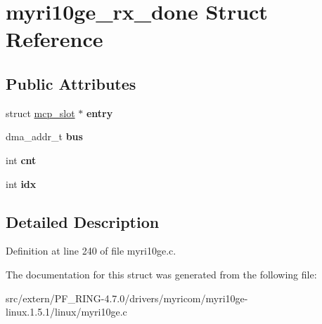 \hypertarget{structmyri10ge__rx__done}{
\section{myri10ge\_\-rx\_\-done Struct Reference}
\label{structmyri10ge__rx__done}
}
\subsection*{Public Attributes}
\begin{DoxyCompactItemize}
\item 
\hypertarget{structmyri10ge__rx__done_abfb64c5ea8531b8c7adfc3a9ff412e18}{
struct \hyperlink{structmcp__slot}{mcp\_\-slot} $\ast$ {\bfseries entry}}
\label{structmyri10ge__rx__done_abfb64c5ea8531b8c7adfc3a9ff412e18}

\item 
\hypertarget{structmyri10ge__rx__done_a774cc65333586fd1d5fc6203e5f03ff7}{
dma\_\-addr\_\-t {\bfseries bus}}
\label{structmyri10ge__rx__done_a774cc65333586fd1d5fc6203e5f03ff7}

\item 
\hypertarget{structmyri10ge__rx__done_a2587ba961744bc3cca03b26b2d571bbf}{
int {\bfseries cnt}}
\label{structmyri10ge__rx__done_a2587ba961744bc3cca03b26b2d571bbf}

\item 
\hypertarget{structmyri10ge__rx__done_a66058641ff88a7d981d84429d492b43f}{
int {\bfseries idx}}
\label{structmyri10ge__rx__done_a66058641ff88a7d981d84429d492b43f}

\end{DoxyCompactItemize}


\subsection{Detailed Description}


Definition at line 240 of file myri10ge.c.



The documentation for this struct was generated from the following file:\begin{DoxyCompactItemize}
\item 
src/extern/PF\_\-RING-\/4.7.0/drivers/myricom/myri10ge-\/linux.1.5.1/linux/myri10ge.c\end{DoxyCompactItemize}
